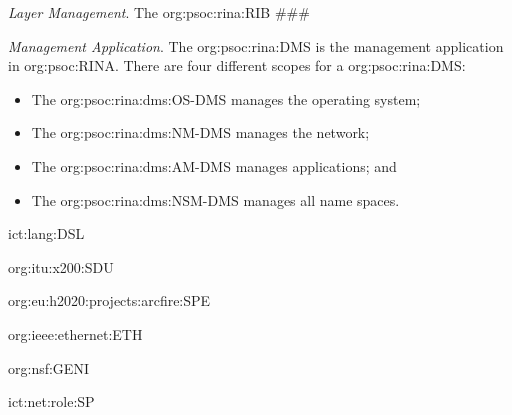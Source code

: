 \textit{Layer Management}.
The \ac{org:psoc:rina:RIB} \#\#\#

\textit{Management Application}.
The \ac{org:psoc:rina:DMS} is the management application in \acs{org:psoc:RINA}.
There are four different scopes for a \ac{org:psoc:rina:DMS}:
    \begin{itemize}[topsep=0pt, partopsep=0pt, nosep]
        \item The \ac{org:psoc:rina:dms:OS-DMS} manages the operating system;
        \item The \ac{org:psoc:rina:dms:NM-DMS} manages the network;
        \item The \ac{org:psoc:rina:dms:AM-DMS} manages applications; and
        \item The \ac{org:psoc:rina:dms:NSM-DMS} manages all name spaces.
    \end{itemize}

\acs{ict:lang:DSL}

\acs{org:itu:x200:SDU}

\acs{org:eu:h2020:projects:arcfire:SPE}

\acs{org:ieee:ethernet:ETH}

\acs{org:nsf:GENI}

\acs{ict:net:role:SP}

